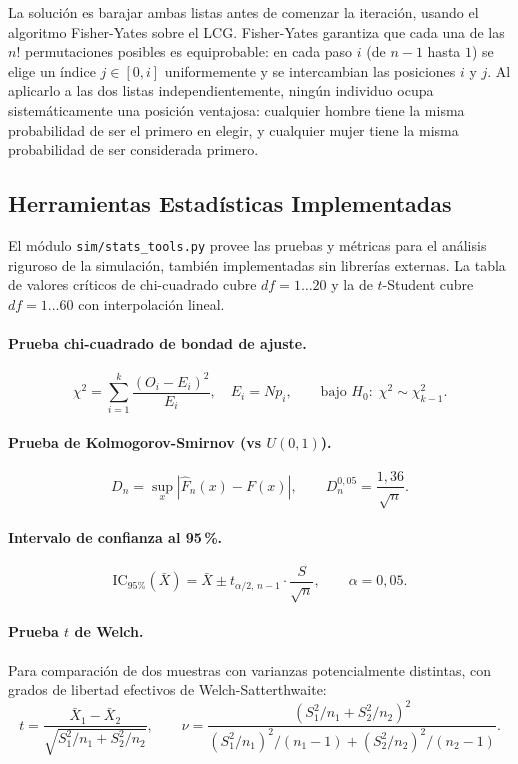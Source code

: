 \documentclass{llncs}
\begin{document}
La solución es barajar ambas listas antes de comenzar la iteración,
usando el algoritmo Fisher-Yates sobre el LCG.
Fisher-Yates garantiza que cada una de las $n!$ permutaciones posibles
es equiprobable: en cada paso $i$ (de $n-1$ hasta $1$) se elige un índice
$j \in [0, i]$ uniformemente y se intercambian las posiciones $i$ y $j$.
Al aplicarlo a las dos listas independientemente, ningún individuo ocupa
sistemáticamente una posición ventajosa: cualquier hombre tiene la misma
probabilidad de ser el primero en elegir, y cualquier mujer tiene la misma
probabilidad de ser considerada primero.

\subsection{Herramientas Estadísticas Implementadas}

El módulo \texttt{sim/stats\_tools.py} provee las pruebas y métricas
para el análisis riguroso de la simulación, también implementadas sin
librerías externas.
La tabla de valores críticos de chi-cuadrado cubre $df = 1\ldots 20$ y la
de $t$-Student cubre $df = 1\ldots 60$ con interpolación lineal.

\paragraph{Prueba chi-cuadrado de bondad de ajuste.}
\[
  \chi^2 = \sum_{i=1}^{k} \frac{(O_i - E_i)^2}{E_i}, \quad E_i = N p_i,
  \qquad \text{bajo } H_0:\; \chi^2 \sim \chi^2_{k-1}.
\]

\paragraph{Prueba de Kolmogorov-Smirnov (vs $U(0,1)$).}
\[
  D_n = \sup_x |\hat{F}_n(x) - F(x)|,
  \qquad D_n^{0{,}05} = \frac{1{,}36}{\sqrt{n}}.
\]

\paragraph{Intervalo de confianza al 95\,\%.}
\[
  \text{IC}_{95\%}(\bar{X}) = \bar{X} \pm t_{\alpha/2,\,n-1}
  \cdot \frac{S}{\sqrt{n}},
  \qquad \alpha = 0{,}05.
\]

\paragraph{Prueba $t$ de Welch.}
Para comparación de dos muestras con varianzas potencialmente distintas,
con grados de libertad efectivos de Welch-Satterthwaite:
\[
  t = \frac{\bar{X}_1 - \bar{X}_2}{\sqrt{S_1^2/n_1 + S_2^2/n_2}},
  \qquad
  \nu = \frac{(S_1^2/n_1 + S_2^2/n_2)^2}
             {(S_1^2/n_1)^2/(n_1-1) + (S_2^2/n_2)^2/(n_2-1)}.
\]
\end{document}
